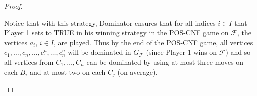 \documentclass[12pt]{article}
\newcommand{\F}{\mathcal{F}}
\begin{document}
\begin{proof}
\begin{enumerate}[(1)]
		
		
		Notice that with this strategy, Dominator ensures that for all indices $i \in I$ that Player 1 sets to TRUE in his winning strategy in the POS-CNF game on $\F$, the vertices $a_i$, $i \in I$, are played. Thus by the end of the POS-CNF game, all vertices $c_1, \ldots, c_n, \ldots, c_1^n, \ldots, c_n^n$ will be dominated in $G_\F$ (since Player 1 wins on $\F$) and so all vertices from $C_1, \ldots, C_n$ can be dominated by using at most three moves on each $B_i$ and at most two on each $C_j$ (on average).
		

\end{enumerate}
\end{proof}
\end{document}
